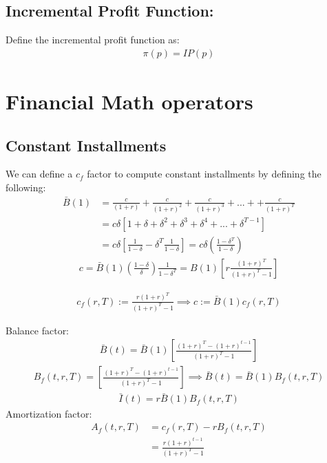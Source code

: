 \documentclass[12pt]{book}
\begin{document}
\subsection{ Incremental Profit Function: }
Define the incremental profit function as:
\begin{align}
\pi(p)=IP(p)
\end{align}
\section{Financial Math operators}
\subsection{Constant Installments}
We can define a $c_f$ factor to compute constant installments by defining the following:
\begin{align}
    \bar{B}(1) &= \frac{c}{(1+r)}+\frac{c}{(1+r)^2}+\frac{c}{(1+r)^3}+...++\frac{c}{(1+r)^T} \nonumber\\
    &=c\delta[1+\delta+\delta^2+\delta^3+\delta^4+...+\delta^{T-1}] \nonumber \\
    &=c\delta\left[\frac{1}{1-\delta}-\delta^T\frac{1}{1-\delta}\right] =c\delta\left(\frac{1-\delta^T}{1-\delta}\right)
\end{align}
\begin{align}
    c=\bar{B}(1)\left(\frac{1-\delta}{\delta}\right)\frac{1}{1-\delta^T}=B(1)\left[r\frac{(1+r)^T}{(1+r)^T-1}\right]
\end{align}

\begin{align}
    c_f(r,T):=\frac{r(1+r)^T}{(1+r)^T-1} \implies c:=\bar{B}(1)c_f(r,T)
\end{align}

Balance factor:
\begin{align}
    \bar{B}(t)=\bar{B}(1)\left[ \frac{(1+r)^T-(1+r)^{t-1}}{(1+r)^T-1} \right]
\end{align}
\begin{align}
    B_f(t,r,T)=\left[ \frac{(1+r)^T-(1+r)^{t-1}}{(1+r)^T-1} \right] \implies \bar{B}(t)=\bar{B}(1)B_f(t,r,T)
\end{align}
\begin{align}
    \bar{I}(t) = r\bar{B}(1)B_f(t,r,T)
\end{align}
Amortization factor:
\begin{align}
    A_f(t,r,T) &= c_f(r,T)-rB_f(t,r,T)\\
    &=\frac{r(1+r)^{t-1}}{(1+r)^T-1}
\end{align}
\end{document}
